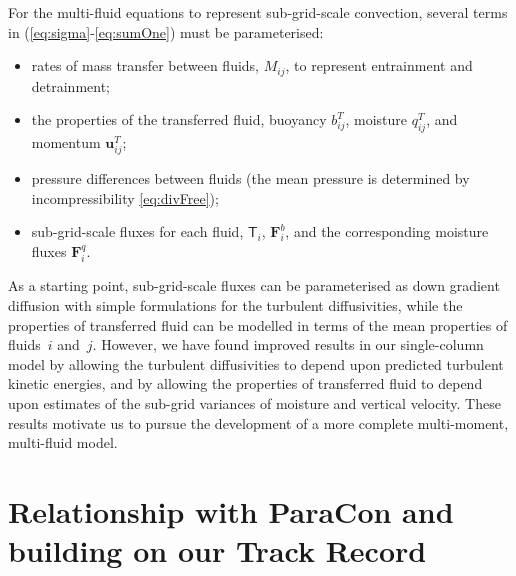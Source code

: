 \documentclass[11pt,a4paper]{article}
\begin{document}
For the multi-fluid equations to represent sub-grid-scale convection, several terms in (\ref{eq:sigma}-\ref{eq:sumOne}) must be parameterised:
\begin{itemize}
\item rates of mass transfer between fluids, $M_{ij}$, to represent entrainment and detrainment;
\item the properties of the transferred fluid, buoyancy $b_{ij}^T$, moisture $q_{ij}^T$, and momentum $\mathbf{u}_{ij}^T$; 
\item pressure differences between fluids (the mean pressure is determined by incompressibility \eqref{eq:divFree});
\item sub-grid-scale fluxes for each fluid, $\mathsf{T}_i$, $\mathbf{F}^b_{i}$, and the corresponding moisture fluxes $\mathbf{F}^q_{i}$.
\end{itemize}

As a starting point, sub-grid-scale fluxes can be parameterised as down gradient diffusion with simple formulations for the turbulent diffusivities,
while the properties of transferred fluid can be modelled in terms of the mean properties of fluids~$i$ and~$j$. 
However, we have found improved results in our single-column model by allowing the turbulent diffusivities to depend upon predicted turbulent
kinetic energies, and by allowing the properties of transferred fluid to depend upon estimates of the sub-grid variances of moisture and vertical velocity.
These results motivate us to pursue the development of a more complete multi-moment, multi-fluid model.

\section{Relationship with ParaCon and building on our Track Record}
\end{document}
